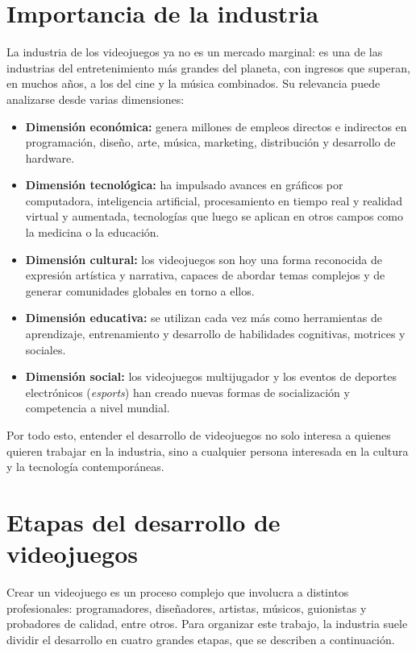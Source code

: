 \documentclass[12pt]{report}
\begin{document}
\section{Importancia de la industria}

La industria de los videojuegos ya no es un mercado marginal: es una de las industrias del entretenimiento más grandes del planeta, con ingresos que superan, en muchos años, a los del cine y la música combinados. Su relevancia puede analizarse desde varias dimensiones:

\begin{itemize}
    \item \textbf{Dimensión económica:} genera millones de empleos directos e indirectos en programación, diseño, arte, música, marketing, distribución y desarrollo de hardware.
    \item \textbf{Dimensión tecnológica:} ha impulsado avances en gráficos por computadora, inteligencia artificial, procesamiento en tiempo real y realidad virtual y aumentada, tecnologías que luego se aplican en otros campos como la medicina o la educación.
    \item \textbf{Dimensión cultural:} los videojuegos son hoy una forma reconocida de expresión artística y narrativa, capaces de abordar temas complejos y de generar comunidades globales en torno a ellos.
    \item \textbf{Dimensión educativa:} se utilizan cada vez más como herramientas de aprendizaje, entrenamiento y desarrollo de habilidades cognitivas, motrices y sociales.
    \item \textbf{Dimensión social:} los videojuegos multijugador y los eventos de deportes electrónicos (\textit{esports}) han creado nuevas formas de socialización y competencia a nivel mundial.
\end{itemize}

Por todo esto, entender el desarrollo de videojuegos no solo interesa a quienes quieren trabajar en la industria, sino a cualquier persona interesada en la cultura y la tecnología contemporáneas.

\section{Etapas del desarrollo de videojuegos}

Crear un videojuego es un proceso complejo que involucra a distintos profesionales: programadores, diseñadores, artistas, músicos, guionistas y probadores de calidad, entre otros. Para organizar este trabajo, la industria suele dividir el desarrollo en cuatro grandes etapas, que se describen a continuación.
\end{document}
